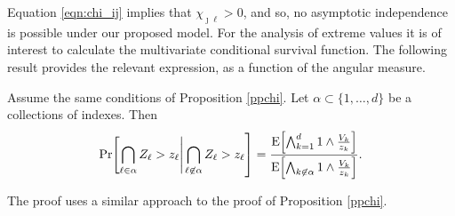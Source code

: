 Equation \ref{eqn:chi_ij} implies that $\chi_{\jmath\ell}>0$, and so, no asymptotic independence is possible under our proposed model. For the analysis of extreme values it is of interest to calculate the multivariate conditional survival function. The following result provides the relevant expression, as a function of the angular measure.
\begin{prop}
Assume the same conditions of Proposition \ref{ppchi}. 
Let $\alpha \subset \{1, \ldots ,d\}$ be a collections of indexes. 
Then     
\begin{equation} \label{eqn:condsurv}
    \mathrm{Pr}\left[\bigcap_{\ell \in \alpha} Z_\ell > z_\ell \right|\left. \bigcap_{\ell\not\in\alpha} Z_\ell > z_\ell\right] =
      \frac{\expect{\bigwedge_{k = 1}^d 1\wedge \frac{V_k}{z_k}}}{\expect{\bigwedge_{k \not\in\alpha}1\wedge\frac{V_k}{z_k}}}.
  \end{equation}
\end{prop}  
The proof uses a similar approach to the proof of Proposition \ref{ppchi}.

